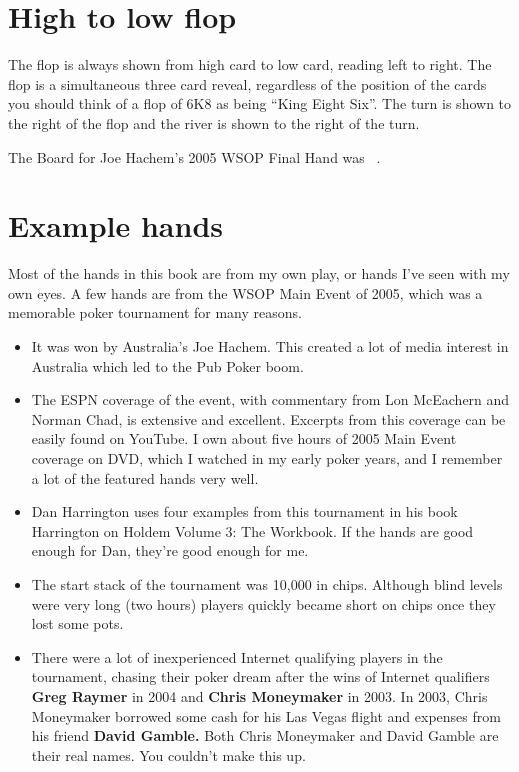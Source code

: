\section*{High to low flop}

The flop is always shown from high card to low card, reading left to
right. The flop is a simultaneous three card reveal, regardless of the
position of the cards you should think of a flop of 6K8 as being
``King Eight Six''. The turn is shown to the right of the flop and the
river is shown to the right of the turn.

The Board for Joe Hachem's 2005 WSOP Final Hand was
\sixh\fived\fourd\As\fourc\ .

\section*{Example hands}

Most of the hands in this book are from my own play, or hands I've
seen with my own eyes. A few hands are from the WSOP Main Event
of 2005, which was a memorable poker tournament for many reasons.

\begin{itemize}
  \item It was won by Australia's Joe Hachem. This created a lot of
    media interest in Australia which led to the Pub Poker boom.
  \item The ESPN coverage of the event, with commentary from
    Lon McEachern and Norman Chad, is extensive and
    excellent. Excerpts from this coverage can be easily found on
    YouTube. I own about five hours of 2005 Main Event coverage on
    DVD, which I watched in my early poker years, and I remember a lot
    of the featured hands very well.
  \item Dan Harrington uses four examples from this tournament in his
    book Harrington on Holdem Volume 3: The Workbook. If the hands are
    good enough for Dan, they're good enough for me.
  \item The start stack of the tournament was 10,000 in
    chips. Although blind levels were very long (two hours)
    players quickly became short on chips once they lost some pots.
  \item There were a lot of inexperienced Internet qualifying players
    in the tournament, chasing their poker dream after the wins of
    Internet qualifiers \textbf{Greg Raymer} in 2004 and \textbf{Chris
    Moneymaker} in 2003. In 2003, Chris Moneymaker
    borrowed some cash for his Las Vegas flight and expenses from his
    friend \textbf{David Gamble.} Both Chris Moneymaker and David Gamble are
    their real names. You couldn't make this up.

\end{itemize}

